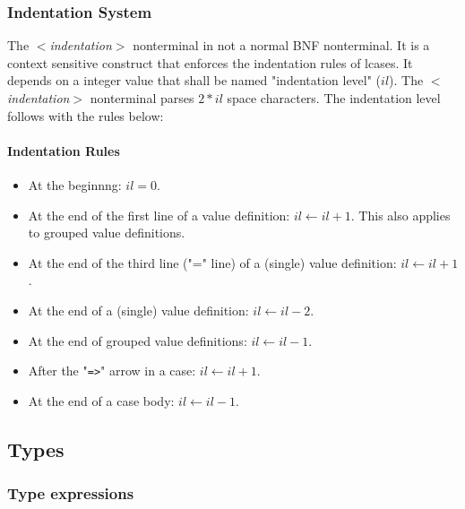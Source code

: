 \documentclass{article}
\begin{document}
\subsubsection{Indentation System}
\label{subsubsec:indsys}

The \textit{$<$indentation$>$} nonterminal in not a normal BNF nonterminal. It is a
context sensitive construct that enforces the indentation rules of lcases.
It depends on a integer value that shall be named "indentation level" ($il$).
The \textit{$<$indentation$>$} nonterminal parses $2*il$ space characters.
The indentation level follows with the rules below:

\paragraph{Indentation Rules}
\begin{itemize}

\item
At the beginnng: $il = 0$.

\item
At the end of the first line of a value definition: $il \leftarrow il + 1$.
This also applies to grouped value definitions.

\item
At the end of the third line ("=" line) of a (single) value definition: $il
\leftarrow il + 1$.

\item
At the end of a (single) value definition: $il \leftarrow il - 2$.

\item
At the end of grouped value definitions: $il \leftarrow il - 1$.

\item
After the "\texttt{=>}" arrow in a case: $il \leftarrow il + 1$.

\item
At the end of a case body: $il \leftarrow il - 1$.

\end{itemize}

\subsection{Types}
\label{subsec:types}

\subsubsection{Type expressions}
\end{document}
